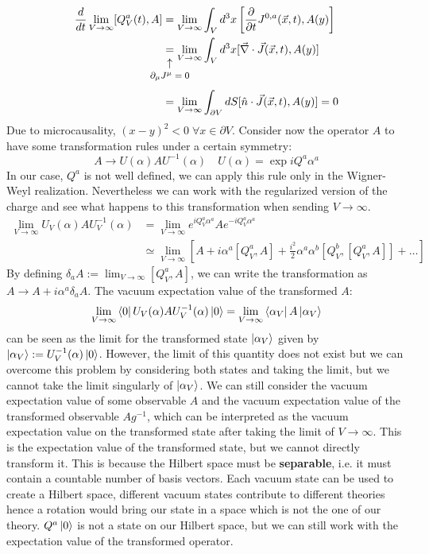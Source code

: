 \documentclass[../main.tex]{subfiles}
\begin{document}
\begin{align*}
\frac{d}{dt}\lim_{V\to\infty}[Q_V^a(t),A]&=\lim_{V\to\infty}\int_Vd^3x\left[\frac{\partial}{\partial t}J^{0,a}(\Vec{x},t),A(y)\right]\\
&\underset{\mathclap{\tikz \node {$\uparrow$} node [below=1ex] {\footnotesize $\partial_\mu J^\mu=0$ };}}{=}\lim_{V\to\infty}\int_Vd^3x[\Vec{\nabla}\cdot\Vec{J}(\Vec{x},t),A(y)]\\
&=\lim_{V\to\infty}\int_{\partial V}dS[\hat{n}\cdot\Vec{J}(\Vec{x},t),A(y)]=0
\end{align*}
Due to microcausality, $(x-y)^2<0\;\forall x\in\partial V$. Consider now the operator $A$ to have some transformation rules under a certain symmetry:
\[
A\to U(\alpha)AU^{-1}(\alpha) \quad U(\alpha)=\exp{iQ^a\alpha^a}
\]
In our case, $Q^a$ is not well defined, we can apply this rule only in the Wigner-Weyl realization. Nevertheless we can work with the regularized version of the charge and see what happens to this transformation when sending $V\to\infty$.
\begin{align*}
\lim_{V\to\infty}U_V(\alpha)AU^{-1}_V(\alpha)&=\lim_{V\to\infty}e^{iQ_V^a\alpha^a}Ae^{-iQ_V^a\alpha^a}\\
&\simeq\lim_{V\to\infty}\left[A+i\alpha^a[Q_V^a,A]+\frac{i^2}{2}\alpha^a\alpha^b[Q_V^b,[Q_V^a,A]]+\dots\right]
\end{align*}
By defining $\delta_aA:=\lim_{V\to\infty}[Q_V^a,A]$, we can write the transformation as $A\to A+i\alpha^a\delta_aA$. The vacuum expectation value of the transformed $A$:
\[
\lim_{V\to\infty}\bra{0}U_V(\alpha)AU_V^{-1}(\alpha)\ket{0}=\lim_{V\to\infty}\bra{\alpha_V}A\ket{\alpha_V}
\]
can be seen as the limit for the transformed state $\ket{\alpha_V}$ given by\\ $\ket{\alpha_V}:=U_V^{-1}(\alpha)\ket{0}$. However, the limit of this quantity does not exist but we can overcome this problem by considering both states and taking the limit, but we cannot take the limit singularly of $\ket{\alpha_V}$. We can still consider the vacuum expectation value of some observable $A$ and the vacuum expectation value of the transformed observable $Ag^{-1}$, which can be interpreted as the vacuum expectation value on the transformed state after taking the limit of $V\to\infty$. This is the expectation value of the transformed state, but we cannot directly transform it. This is because the Hilbert space must be \textbf{separable}, i.e. it must contain a countable number of basis vectors. Each vacuum state can be used to create a Hilbert space, different vacuum states contribute to different theories hence a rotation would bring our state in a space which is not the one of our theory. $Q^a\ket{0}$ is not a state on our Hilbert space, but we can still work with the expectation value of the transformed operator.
\end{document}
